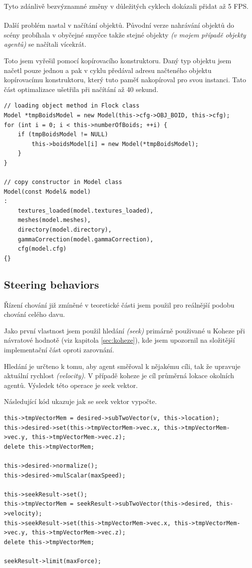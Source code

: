 \documentclass[czech,public,dept460,male,cpdeclaration]{diploma}
\begin{document}
Tyto zdánlivě bezvýznamné změny v důležitých cyklech dokázali přidat až 5 FPS.
\\\\
Další problém nastal v načítání objektů. Původní verze nahrávání objektů do scény probíhala v obyčejné smyčce takže stejné objekty \textit{(v mojem případě objekty agentů)} se načítali vícekrát. 

Toto jsem vyřešil pomocí kopírovacího konstruktoru. Daný typ objektu jsem načetl pouze jednou a pak v cyklu předával adresu načteného objektu kopírovacímu konstruktoru, který tuto paměť nakopíroval pro svou instanci. Tato část optimalizace ušetřila při načítání až 40 sekund.

\begin{lstlisting}[label=src:copy constructor,caption=Ukázka použití kopírovacího konstruktoru]
// loading object method in Flock class
Model *tmpBoidsModel = new Model(this->cfg->OBJ_BOID, this->cfg);
for (int i = 0; i < this->numberOfBoids; ++i) {
	if (tmpBoidsModel != NULL)
		this->boidsModel[i] = new Model(*tmpBoidsModel);
	}
}

// copy constructor in Model class
Model(const Model& model) 
: 
	textures_loaded(model.textures_loaded),
	meshes(model.meshes),
	directory(model.directory),
	gammaCorrection(model.gammaCorrection),
	cfg(model.cfg)
{}
\end{lstlisting}

\subsection{Steering behaviors}
Řízení chování \cite{linkToSteeringBehaviors} již zmíněné v teoretické části jsem použil pro reálnější podobu chování celého davu.

Jako první vlastnost jsem použil hledání \textit{(seek)} primárně použivané u Koheze při návratové hodnotě (viz kapitola \ref{sec:koheze}), kde jsem upozornil na složitější implementační část oproti zarovnání.

Hledání je určteno k tomu, aby agent směřoval k nějakému cíli, tak že upravuje aktuální rychlost \textit{(velocity)}. V případě koheze je cíl průměrná lokace okolních agentů. Výsledek této operace je seek vektor.

Následující kód ukazuje jak se seek vektor vypočte.

\begin{lstlisting}[label=src:seek,caption=Vypočtení seek vektoru]
this->tmpVectorMem = desired->subTwoVector(v, this->location);
this->desired->set(this->tmpVectorMem->vec.x, this->tmpVectorMem->vec.y, this->tmpVectorMem->vec.z);
delete this->tmpVectorMem;

this->desired->normalize();
this->desired->mulScalar(maxSpeed);

this->seekResult->set();
this->tmpVectorMem = seekResult->subTwoVector(this->desired, this->velocity);
this->seekResult->set(this->tmpVectorMem->vec.x, this->tmpVectorMem->vec.y, this->tmpVectorMem->vec.z);
delete this->tmpVectorMem;

seekResult->limit(maxForce);
\end{lstlisting}
\end{document}
